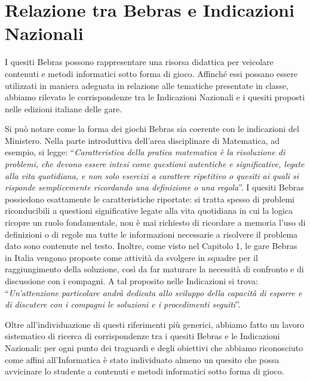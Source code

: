 \documentclass[12pt]{report}
\begin{document}
\section{Relazione tra Bebras e Indicazioni Nazionali} \label{classIndicazioni}

I quesiti Bebras possono rappresentare una risorsa didattica per veicolare contenuti e metodi informatici sotto forma di gioco. Affinché essi possano essere utilizzati in maniera adeguata in relazione alle tematiche presentate in classe, abbiamo rilevato le corrispondenze tra le Indicazioni Nazionali e i quesiti proposti nelle edizioni italiane delle gare.

Si può notare come la forma dei giochi Bebras sia coerente con le indicazioni del Ministero.
Nella parte introduttiva dell'area disciplinare di Matematica, ad esempio, si legge: ``\textit{Caratteristica della pratica matematica è la risoluzione di problemi, che devono essere intesi come questioni autentiche e significative, legate alla vita quotidiana, e non solo esercizi a carattere ripetitivo o quesiti ai quali si risponde semplicemente ricordando una definizione o una regola}''. I quesiti Bebras possiedono esattamente le caratteristiche riportate: si tratta spesso di problemi riconducibili a questioni significative legate alla vita quotidiana in cui la logica ricopre un ruolo fondamentale, non è mai richiesto di ricordare a memoria l’uso di definizioni o di regole ma tutte le informazioni necessarie a risolvere il problema dato sono contenute nel testo.
Inoltre, come visto nel Capitolo 1, le gare Bebras in Italia vengono proposte come attività da svolgere in squadre per il raggiungimento della soluzione, così da far maturare la necessità di confronto e di discussione con i compagni. A tal proposito nelle Indicazioni si trova: ``\textit{Un’attenzione particolare andrà dedicata allo sviluppo della capacità di esporre e di discutere con i compagni le soluzioni e i procedimenti seguiti}''. 

Oltre all'individuazione di questi riferimenti più generici, abbiamo fatto un lavoro sistematico di ricerca di corrispondenze tra i quesiti Bebras e le Indicazioni Nazionali: per ogni punto dei traguardi e degli obiettivi che abbiamo riconosciuto come affini all'Informatica è stato individuato almeno un quesito che possa avvicinare lo studente a contenuti e metodi informatici sotto forma di gioco.
\end{document}
